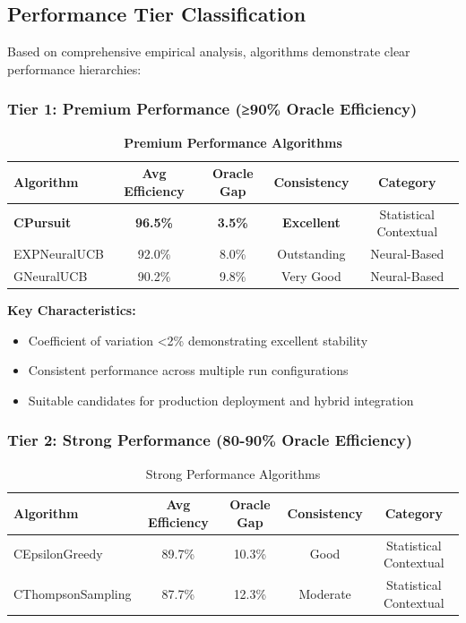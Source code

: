 \documentclass[12pt,a4paper]{article}
\newcommand{\success}[1]{\textcolor{successcolor}{\textbf{#1}}}
\begin{document}
\subsection{Performance Tier Classification}

Based on comprehensive empirical analysis, algorithms demonstrate clear performance hierarchies:

\subsubsection{Tier 1: Premium Performance (≥90\% Oracle Efficiency)}

\begin{table}[H]
\centering
\caption{\success{Premium Performance Algorithms}}
\begin{tabular}{|l|c|c|c|c|}
\hline
\textbf{Algorithm} & \textbf{Avg Efficiency} & \textbf{Oracle Gap} & \textbf{Consistency} & \textbf{Category} \\
\hline
\hline
\success{CPursuit} & \success{\textbf{96.5\%}} & \success{3.5\%} & \success{Excellent} & Statistical Contextual \\
EXPNeuralUCB & 92.0\% & 8.0\% & Outstanding & Neural-Based \\
GNeuralUCB & 90.2\% & 9.8\% & Very Good & Neural-Based \\
\hline
\end{tabular}
\end{table}

\textbf{Key Characteristics:}
\begin{itemize}
\item Coefficient of variation <2\% demonstrating excellent stability
\item Consistent performance across multiple run configurations
\item Suitable candidates for production deployment and hybrid integration
\end{itemize}

\subsubsection{Tier 2: Strong Performance (80-90\% Oracle Efficiency)}

\begin{table}[H]
\centering
\caption{Strong Performance Algorithms}
\begin{tabular}{|l|c|c|c|c|}
\hline
\textbf{Algorithm} & \textbf{Avg Efficiency} & \textbf{Oracle Gap} & \textbf{Consistency} & \textbf{Category} \\
\hline
\hline
CEpsilonGreedy & 89.7\% & 10.3\% & Good & Statistical Contextual \\
CThompsonSampling & 87.7\% & 12.3\% & Moderate & Statistical Contextual \\
\hline
\end{tabular}
\end{table}
\end{document}
